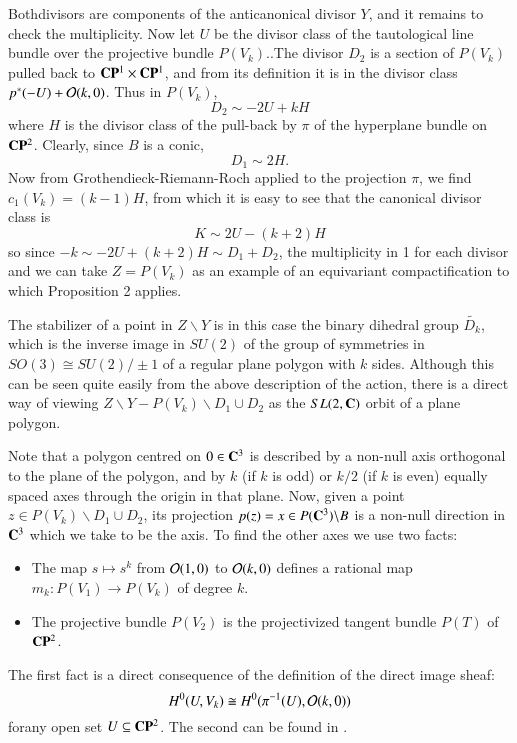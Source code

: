 Both\pageoriginale divisors are components of the anticanonical divisor $Y$, and it  remains to check the multiplicity. Now let $U$ be the divisor class of the tautological line bundle over the projective bundle $P(V_{k})$..The divisor $D_{2}$ is a section of $P(V_{k})$ pulled back to $\mathbf{C}\mathbf{P}^{1} \times\mathbf{C}\mathbf{P}^{1}$, and from its definition it is in the divisor class $p^{*}(-U) + \mathcal{O}(k,0)$. Thus in $P(V_{k})$,
\begin{equation*}\label{chap7-eq-8}
D_{2}\sim -2U + kH\tag{8}
\end{equation*}
where $H$ is the divisor class of the pull-back by $\pi$ of the hyperplane bundle on $\mathbf{C}\mathbf{P}^{2}$. Clearly, since $B$ is a conic,
\begin{equation*}\label{chap7-eq-9}
D_{1} \sim 2H.\tag{9}
\end{equation*}
Now from Grothendieck-Riemann-Roch applied to the projection $\pi$, we find $c_{1}(V_{k})=(k-1)H$, from which it is easy to see that the canonical divisor class is
$$
K\sim 2U -(k+2)H
$$
so since $-k\sim -2U +(k+2)H\sim D_{1} + D_{2}$, the multiplicity in 1 for each divisor and we can take $Z =P(V_{k})$ as an example of an equivariant compactification to which Proposition 2 applies.

The stabilizer of a point in $Z\backslash Y$ is in this case the binary dihedral group $\tilde{D_{k}}$, which is the inverse image in $SU(2)$ of the group of symmetries in $SO(3) \cong SU(2)/\pm 1$ of a regular plane polygon  with $k$ sides. Although this can be seen quite easily from the above description of the action, there is a direct way of viewing $Z\backslash Y - P(V_{k})\backslash D_{1}\cup D_{2}$ as the $SL(2, \mathbf{C})$ orbit of a plane polygon.

Note that a polygon centred on $0 \in \mathbf{C}^{3}$ is described by a non-null axis orthogonal to the plane of the polygon, and by $k$ (if $k$ is odd) or $k/2$ (if $k$ is even) equally spaced axes through the origin in that plane. Now, given a point $z\in P(V_{k})\backslash D_{1}\cup D_{2}$, its projection $p(z)= x \in P(\mathbf{C}^{3})\backslash B$ is a non-null direction in $\mathbf{C}^{3}$ which we take to be the axis. To find the other axes we use two facts: 
\begin{itemize}
\item The map $s \mapsto s^{k}$ from $\mathcal{O}(1,0)$ to $\mathcal{O}(k,0)$ defines a rational map $m_{k} : P(V_{1})\rightarrow P(V_{k})$ of degree $k$.
\item The projective bundle $P(V_{2})$ is the projectivized tangent bundle $P(T)$ of $\mathbf{C}\mathbf{P}^{2}$.
\end{itemize}
The first fact is a direct consequence of the definition of the direct image sheaf:
$$
H^{0}(U, V_{k})\cong H^{0}(\pi^{-1}(U), \mathcal{O}(k,0))
$$
for\pageoriginale any open set $U \subseteq \mathbf{C}\mathbf{P}^{2}$. The second can be found in \cite{chap7-key16}.

